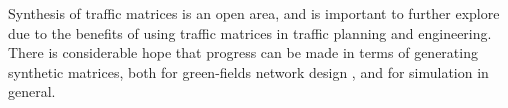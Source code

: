Synthesis of traffic matrices is an open area, and is important to further 
explore due to the benefits of using traffic matrices in traffic planning and
engineering. There is considerable hope that progress can be made in terms
of generating synthetic matrices, both for green-fields network design
\cite{Kowalski95TeleModel}, and for simulation in general. 

 